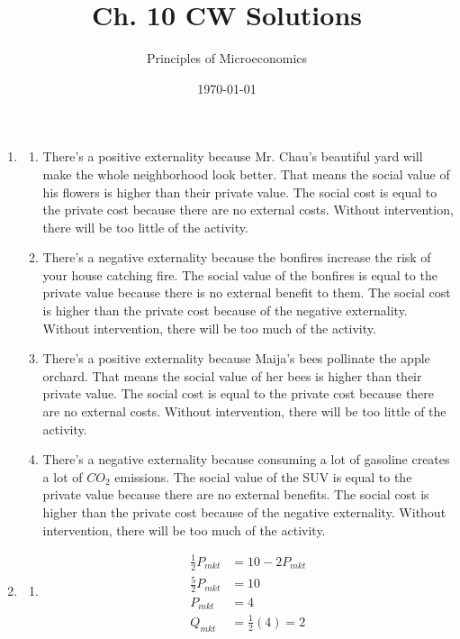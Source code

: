 \documentclass{article}
\title{Ch. 10 CW Solutions}
\author{Principles of Microeconomics}
\date{\today}
\begin{document}
\maketitle

\begin{enumerate}

\item

	\begin{enumerate}
	
	\item There's a positive externality because Mr. Chau's beautiful yard will make the whole neighborhood look better. That means the social value of his flowers is higher than their private value. The social cost is equal to the private cost because there are no external costs. Without intervention, there will be too little of the activity.
	
	\item There's a negative externality because the bonfires increase the risk of your house catching fire. The social value of the bonfires is equal to the private value because there is no external benefit to them. The social cost is higher than the private cost because of the negative externality. Without intervention, there will be too much of the activity.
	
	\item There's a positive externality because Maija's bees pollinate the apple orchard. That means the social value of her bees is higher than their private value. The social cost is equal to the private cost because there are no external costs. Without intervention, there will be too little of the activity.
	
	\item There's a negative externality because consuming a lot of gasoline creates a lot of $CO_2$ emissions. The social value of the SUV is equal to the private value because there are no external benefits. The social cost is higher than the private cost because of the negative externality. Without intervention, there will be too much of the activity.
		
	\end{enumerate}
	
\item

	\begin{enumerate}
	
	\item
		\begin{align*}
		\frac{1}{2}P_{mkt} &= 10 - 2P_{mkt} \\
		\frac{5}{2}P_{mkt} & = 10 \\
		P_{mkt} &= 4 \\
		Q_{mkt} &= \frac{1}{2}(4) = 2
		\end{align*}
		

\end{enumerate}
\end{enumerate}
\end{document}
